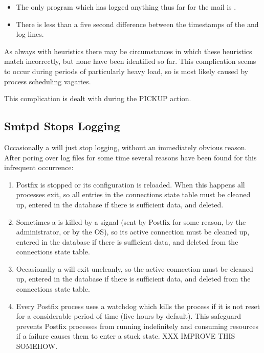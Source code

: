 \begin{itemize}

    \item The only program which has logged anything thus far for the mail
        is .

    \item There is less than a five second difference between the
        timestamps of the  and  log lines.

\end{itemize}

As always with heuristics there may be circumstances in which these
heuristics match incorrectly, but none have been identified so far.  This
complication seems to occur during periods of particularly heavy load, so
is most likely caused by process scheduling vagaries.

This complication is dealt with during the PICKUP action.

\subsection{Smtpd Stops Logging}

\label{smtpd stops logging}

Occasionally a  will just stop logging, without an
immediately obvious reason.  After poring over log files for some time
several reasons have been found for this infrequent occurrence:

\begin{enumerate}

    \item Postfix is stopped or its configuration is reloaded.  When this
        happens all  processes exit, so all entries in the
        connections state table must be cleaned up, entered in the database
        if there is sufficient data, and deleted.

    \item Sometimes a  is killed by a signal (sent by Postfix
        for some reason, by the administrator, or by the OS), so its active
        connection must be cleaned up, entered in the database if there is
        sufficient data, and deleted from the connections state table.

    \item Occasionally a  will exit uncleanly, so the active
        connection must be cleaned up, entered in the database if there is
        sufficient data, and deleted from the connections state table.

    \item Every Postfix process uses a watchdog which kills the process if
        it is not reset for a considerable period of time (five hours by
        default).  This safeguard prevents Postfix processes from running
        indefinitely and consuming resources if a failure causes them to
        enter a stuck state.  XXX IMPROVE THIS SOMEHOW\@.

\end{enumerate}

